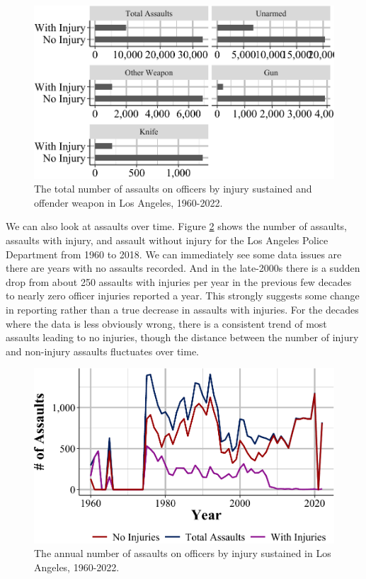\documentclass[
  12pt,
  openany]{book}
\begin{document}
\begin{figure}

{\centering \includegraphics[width=0.9\linewidth]{07_leoka_files/figure-latex/leokaAssaultTypeInjury-1} 

}

\caption{The total number of assaults on officers by injury sustained and offender weapon in Los Angeles, 1960-2022.}\label{fig:leokaAssaultTypeInjury}
\end{figure}

We can also look at assaults over time. Figure \ref{fig:leokaAssaultsInjuryYear} shows the number of assaults, assaults with injury, and assault without injury for the Los Angeles Police Department from 1960 to 2018. We can immediately see some data issues are there are years with no assaults recorded. And in the late-2000s there is a sudden drop from about 250 assaults with injuries per year in the previous few decades to nearly zero officer injuries reported a year. This strongly suggests some change in reporting rather than a true decrease in assaults with injuries. For the decades where the data is less obviously wrong, there is a consistent trend of most assaults leading to no injuries, though the distance between the number of injury and non-injury assaults fluctuates over time.

\begin{figure}

{\centering \includegraphics[width=0.9\linewidth]{07_leoka_files/figure-latex/leokaAssaultsInjuryYear-1} 

}

\caption{The annual number of assaults on officers by injury sustained in Los Angeles, 1960-2022.}\label{fig:leokaAssaultsInjuryYear}
\end{figure}
\end{document}
